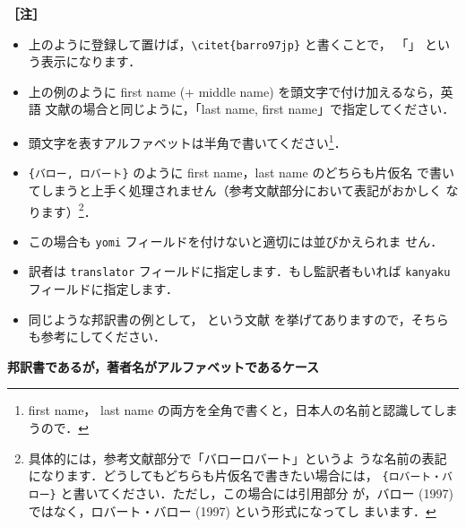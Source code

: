 \documentclass[article]{jlreq}
\newcommand{\midashii}[1]{\noindent \textbf{［#1］}}
\begin{document}
\midashii{注} 
\begin{itemize}
 \item 上のように登録して置けば，\verb|\citet{barro97jp}| と書くことで，
       「\citet{barro97jp}」 という表示になります．
 \item 上の例のように first name (+ middle name) を頭文字で付け加えるなら，英語
       文献の場合と同じように，「last name, first name」で指定してください．
 \item 頭文字を表すアルファベットは半角で書いてください\footnote{first name，
       last name の両方を全角で書くと，日本人の名前と認識してしまうので．}．
 \item \verb|{バロー, ロバート}| のように first name，last name のどちらも片仮名
       で書いてしまうと上手く処理されません（参考文献部分において表記がおかしく
       なります）\footnote{具体的には，参考文献部分で「バローロバート」というよ
       うな名前の表記になります．どうしてもどちらも片仮名で書きたい場合には，
       \texttt{\{ロバート・バロー\}} と書いてください．ただし，この場合には引用部分
       が，バロー (1997) ではなく，ロバート・バロー (1997) という形式になってし
       まいます．}．
 \item この場合も \texttt{yomi} フィールドを付けないと適切には並びかえられま
       せん．
 \item 訳者は \texttt{translator} フィールドに指定します．もし監訳者もいれば
       \texttt{kanyaku} フィールドに指定します．
 \item 同じような邦訳書の例として，\cite{markusen99jp:trade_vol_1} という文献
       を挙げてありますので，そちらも参考にしてください．
\end{itemize}

\vspace*{1em}

\noindent \textbf{邦訳書であるが，著者名がアルファベットであるケース}
\end{document}

